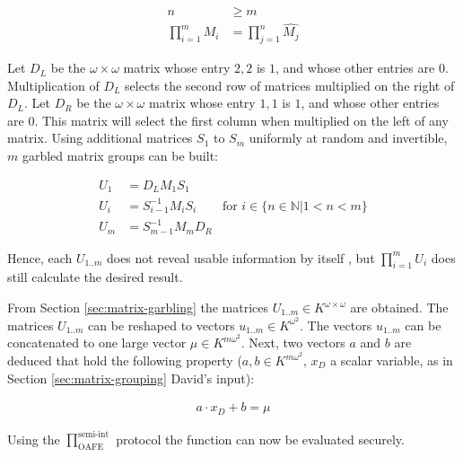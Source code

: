 \begin{align*}
n & \geq m \\
\prod_{i=1}^m M_i & = \prod_{j=1}^n \widehat{M_j}
\end{align*}

\label{sec:matrix-garbling}

Let $D_L$ be the $\omega \times \omega$ matrix whose entry $2,2$ is $1$, and
whose other entries are $0$. Multiplication of $D_L$ selects the second row of
matrices multiplied on the right of $D_L$. Let $D_R$ be the $\omega \times
\omega$ matrix whose entry $1,1$ is $1$, and whose other entries are $0$. This
matrix will select the first column when multiplied on the left of any matrix.
Using additional matrices $S_1$ to $S_{m}$ uniformly at random and invertible,
$m$ garbled matrix groups can be built:

\begin{align*}
U_1 & = D_L M_1 S_1 \\
U_i & = S_{i-1}^{-1} M_i S_i &
\text{for $i \in \{n \in \mathbb{N} \big| 1 < n < m\}$}\\
U_m & = S_{m-1}^{-1} M_m D_R
\end{align*}

\noindent{} Hence, each $U_{1..m}$ does not reveal usable information by itself
\cite{cramer03}, but $\prod_{i=1}^m U_i$ does still calculate the desired
result.



From Section \ref{sec:matrix-garbling} the matrices $U_{1..m} \in K^{\omega
\times \omega}$ are obtained. The matrices $U_{1..m}$ can be reshaped to vectors
$u_{1..m} \in K^{\omega^2}$. The vectors $u_{1..m}$ can be concatenated to one
large vector $\mu \in K^{m\omega^2}$. Next, two vectors $a$ and $b$ are deduced
that hold the following property ($a, b \in K^{m\omega^2}$, $x_D$ a scalar
variable, as in Section \ref{sec:matrix-grouping} David's input):

\begin{align}
a \cdot x_D + b = \mu
\end{align}

Using the $\prod^{\text{semi-int}}_{\text{OAFE}}$ protocol \cite{davidgoliath}
the function can now be evaluated securely.

